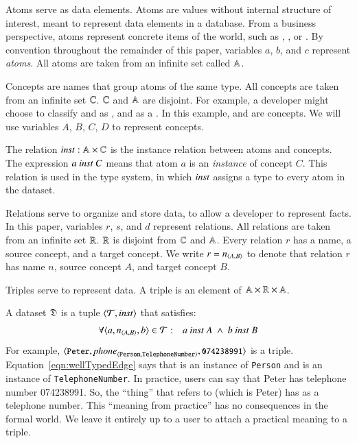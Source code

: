 \documentclass{elsarticle}
\begin{document}
   Atoms serve as data elements.
   Atoms are values without internal structure of interest, meant to represent data elements in a database.
   From a business perspective, atoms represent concrete items of the world,
   such as , , or .
   By convention throughout the remainder of this paper, variables $a$, $b$, and $c$ represent \emph{atoms}.
   All atoms are taken from an infinite set called $\mathbb{A}$.
   
   Concepts are names that group atoms of the same type.
   All concepts are taken from an infinite set $\mathbb{C}$.
   $\mathbb{C}$ and $\mathbb{A}$ are disjoint.
   For example, a developer might choose to classify  and  as ,
   and  as a .
   In this example,  and  are concepts.
   We will use variables $A$, $B$, $C$, $D$ to represent concepts.

   The relation $\text{\it inst\/}:\mathbb{A}\times\mathbb{C}$ is the instance relation between atoms and concepts.
   The expression $a\ \text{\it inst\/}\ C$ means that atom $a$ is an \emph{instance} of concept $C$.
   This relation is used in the type system, in which $\text{\it inst\/}$ assigns a type to every atom in the dataset.

   Relations serve to organize and store data, to allow a developer to represent facts.
   In this paper, variables $r$, $s$, and $d$ represent relations.
   All relations are taken from an infinite set $\mathbb{R}$.
   $\mathbb{R}$ is disjoint from $\mathbb{C}$ and $\mathbb{A}$.
   Every relation $r$ has a name, a source concept, and a target concept.
   We write $r=\text{\it n\/}_{\langle{A},{B}\rangle}$ to denote that relation $r$ has name $n$, source concept $A$, and target concept $B$.

   Triples serve to represent data.
   A triple is an element of $\mathbb{A}\times\mathbb{R}\times\mathbb{A}$.

   A dataset $\mathfrak{D}$ is a tuple $\langle{\mathcal{T}},{\text{\it inst\/}}\rangle$ that satisfies:
\begin{eqnarray}
   \forall\triple{a}{\declare{n}{A}{B}}{b}\in\triples&:&a\ \inst\ A\ \wedge\ b\ \inst\ B
   \label{eqn:wellTypedEdge}
\end{eqnarray}
   For example, $\langle{\text{{\tt\small Peter}}},{\text{\it \text{\it phone\/}\/}_{\langle{\tt Person},{\tt TelephoneNumber}\rangle}},{\text{{\tt\small 074238991}}}\rangle$ is a triple.
   Equation~\ref{eqn:wellTypedEdge} says that  is an instance of {\tt Person} and  is an instance of {\tt TelephoneNumber}.
   In practice, users can say that Peter has telephone number 074238991.
   So, the ``thing'' that  refers to (which is Peter) has  as a telephone number.
   This ``meaning from practice'' has no consequences in the formal world.
   We leave it entirely up to a user to attach a practical meaning to a triple.
\end{document}
